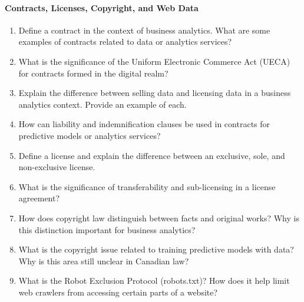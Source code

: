 \paragraph*{Contracts, Licenses, Copyright, and Web Data}
\begin{enumerate}
	\item Define a contract in the context of business analytics. What are some examples of contracts related to data or analytics services?
	\item What is the significance of the Uniform Electronic Commerce Act (UECA) for contracts formed in the digital realm?
	\item Explain the difference between selling data and licensing data in a business analytics context. Provide an example of each.
	\item How can liability and indemnification clauses be used in contracts for predictive models or analytics services?
	\item Define a license and explain the difference between an exclusive, sole, and non-exclusive license.
	\item What is the significance of transferability and sub-licensing in a license agreement?
	\item How does copyright law distinguish between facts and original works? Why is this distinction important for business analytics?
	\item What is the copyright issue related to training predictive models with data? Why is this area still unclear in Canadian law?
	\item What is the Robot Exclusion Protocol (robots.txt)? How does it help limit web crawlers from accessing certain parts of a website?
\end{enumerate}
